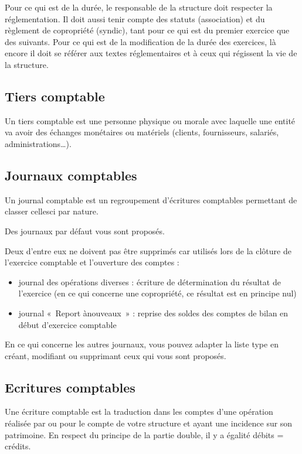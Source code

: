 \documentclass[a4paper,10pt,oneside,french]{sphinxmanual}
\begin{document}
\sphinxAtStartPar
Pour ce qui est de la durée, le responsable de la structure doit respecter la réglementation. Il doit aussi tenir compte des statuts (association) et du règlement de copropriété (syndic), tant pour ce qui est du premier exercice que des suivants. Pour ce qui est de la modification de la durée des exercices, là encore il doit se référer aux textes réglementaires et à ceux qui régissent la vie de la structure.


\subsection{Tiers comptable}
\label{\detokenize{accounting/definition:tiers-comptable}}
\sphinxAtStartPar
Un tiers comptable est une personne physique ou morale avec laquelle une entité va avoir des échanges monétaires ou matériels (clients, fournisseurs, salariés, administrations…).


\subsection{Journaux comptables}
\label{\detokenize{accounting/definition:journaux-comptables}}
\sphinxAtStartPar
Un journal comptable est un regroupement d’écritures comptables permettant de classer celles\sphinxhyphen{}ci par nature.

\sphinxAtStartPar
Des journaux par défaut vous sont proposés.

\sphinxAtStartPar
Deux d’entre eux ne doivent pas être supprimés car utilisés lors de la clôture de l’exercice comptable et l’ouverture des comptes :
\begin{itemize}
\item {} 
\sphinxAtStartPar
journal des opérations diverses : écriture de détermination du résultat de l’exercice (en ce qui concerne une copropriété, ce résultat est en principe nul)

\item {} 
\sphinxAtStartPar
journal « Report à\sphinxhyphen{}nouveaux » : reprise des soldes des comptes de bilan en début d’exercice comptable

\end{itemize}

\sphinxAtStartPar
En ce qui concerne les autres journaux, vous pouvez adapter la liste type en créant, modifiant ou supprimant ceux qui vous sont proposés.


\subsection{Ecritures comptables}
\label{\detokenize{accounting/definition:ecritures-comptables}}
\sphinxAtStartPar
Une écriture comptable est la traduction dans les comptes d’une opération réalisée par ou pour le compte de votre structure et ayant une incidence sur son patrimoine. En respect du principe de la partie double, il y a égalité débits = crédits.
\end{document}
